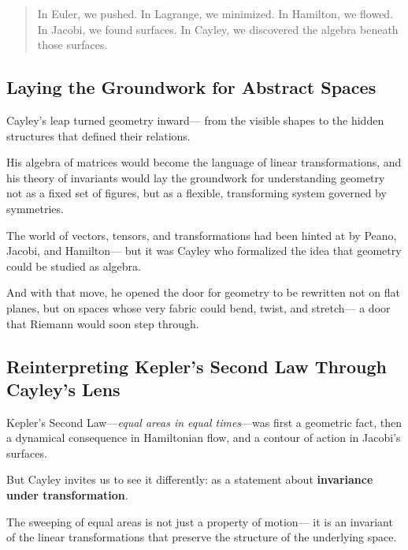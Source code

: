 \bigskip

\begin{quote}
In Euler, we pushed.  
In Lagrange, we minimized.  
In Hamilton, we flowed.  
In Jacobi, we found surfaces.  
In Cayley, we discovered the algebra beneath those surfaces.
\end{quote}

\subsection*{Laying the Groundwork for Abstract Spaces}

Cayley’s leap turned geometry inward—  
from the visible shapes to the hidden structures that defined their relations.

His algebra of matrices would become the language of linear transformations,  
and his theory of invariants would lay the groundwork for understanding geometry not as a fixed set of figures,  
but as a flexible, transforming system governed by symmetries.

The world of vectors, tensors, and transformations had been hinted at by Peano, Jacobi, and Hamilton—  
but it was Cayley who formalized the idea that geometry could be studied as algebra.

And with that move, he opened the door for geometry to be rewritten not on flat planes,  
but on spaces whose very fabric could bend, twist, and stretch—  
a door that Riemann would soon step through.

\subsection*{Reinterpreting Kepler’s Second Law Through Cayley’s Lens}

Kepler’s Second Law—\textit{equal areas in equal times}—was first a geometric fact,  
then a dynamical consequence in Hamiltonian flow,  
and a contour of action in Jacobi’s surfaces.

But Cayley invites us to see it differently:  
as a statement about \textbf{invariance under transformation}.

\bigskip

\begin{tcolorbox}[colback=green!5!white, colframe=green!60!black, title=\textbf{Cayley's View: Kepler as Invariant Theory}]
The sweeping of equal areas is not just a property of motion—  
it is an invariant of the linear transformations that preserve the structure of the underlying space.
\end{tcolorbox}

